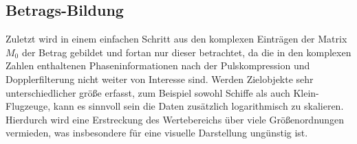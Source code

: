 
\subsection{Betrags-Bildung}
Zuletzt wird in einem einfachen Schritt aus den komplexen Einträgen der Matrix $M_0$ der Betrag gebildet und fortan nur dieser betrachtet, da die in den komplexen Zahlen enthaltenen Phaseninformationen nach der Pulskompression und Dopplerfilterung nicht weiter von Interesse sind. Werden Zielobjekte sehr unterschiedlicher größe erfasst, zum Beispiel sowohl Schiffe als auch Klein-Flugzeuge, kann es sinnvoll sein die Daten zusätzlich logarithmisch zu skalieren. Hierdurch wird eine Erstreckung des Wertebereichs über viele Größenordnungen vermieden, was insbesondere für eine visuelle Darstellung ungünstig ist. 



